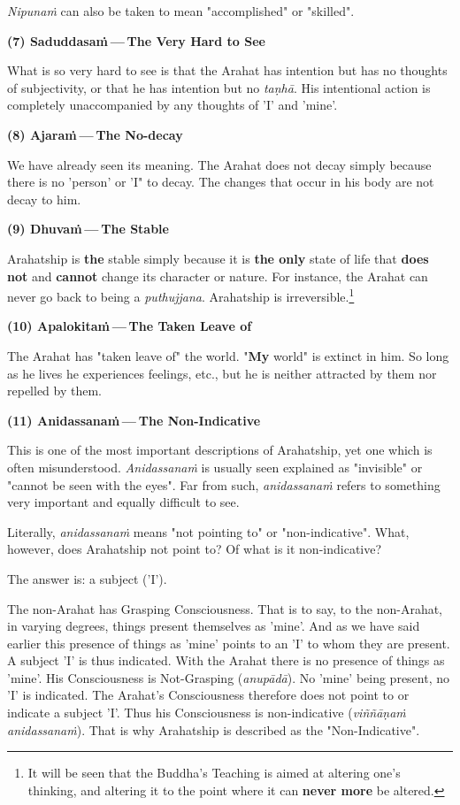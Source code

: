 \emph{Nipunaṁ} can also be taken to mean "accomplished" or "skilled".


\textbf{(7) Saduddasaṁ — The Very Hard to See}


What is so very hard to see is that the Arahat has intention but has no
thoughts of subjectivity, or that he has intention but no \emph{taṇhā}. His
intentional action is completely unaccompanied by any thoughts of 'I'
and 'mine'.


\textbf{(8) Ajaraṁ — The No-decay}


We have already seen its meaning. The Arahat does not decay simply
because there is no 'person' or 'I" to decay. The changes that occur in
his body are not decay to him.


\textbf{(9) Dhuvaṁ — The Stable}


Arahatship is \textbf{the} stable simply because it is \textbf{the only} state of life
that \textbf{does not} and \textbf{cannot} change its character or nature. For
instance, the Arahat can never go back to being a \emph{puthujjana}.
Arahatship is irreversible.\footnote{It will be seen that the Buddha’s Teaching is aimed at altering one’s thinking, and altering it to the point where it can \textbf{never more} be altered.}


\textbf{(10) Apalokitaṁ — The Taken Leave of}


The Arahat has "taken leave of" the world. "\textbf{My} world" is extinct in
him. So long as he lives he experiences feelings, etc., but he is
neither attracted by them nor repelled by them.


\textbf{(11) Anidassanaṁ — The Non-Indicative}


This is one of the most important descriptions of Arahatship, yet one
which is often misunderstood. \emph{Anidassanaṁ} is usually seen explained as
"invisible" or "cannot be seen with the eyes". Far from such,
\emph{anidassanaṁ} refers to something very important and equally difficult
to see.


Literally, \emph{anidassanaṁ} means "not pointing to" or "non-indicative".
What, however, does Arahatship not point to? Of what is it
non-indicative?


The answer is: a subject ('I').


The non-Arahat has Grasping Consciousness. That is to say, to the
non-Arahat, in varying degrees, things present themselves as 'mine'. And
as we have said earlier this presence of things as 'mine' points to an
'I' to whom they are present. A subject 'I' is thus indicated. With the
Arahat there is no presence of things as 'mine'. His Consciousness is
Not-Grasping (\emph{anupādā}). No 'mine' being present, no 'I' is
indicated. The Arahat’s Consciousness therefore does not point to or
indicate a subject 'I'. Thus his Consciousness is non-indicative
(\emph{viññāṇaṁ anidassanaṁ}). That is why Arahatship is described as the
"Non-Indicative".


